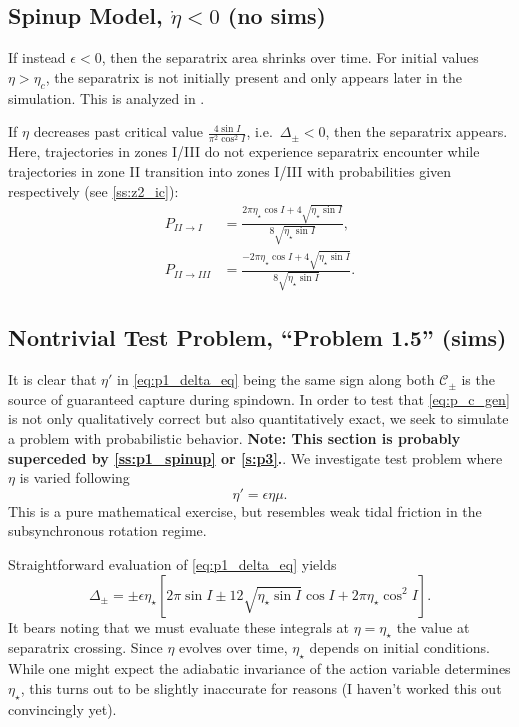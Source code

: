 \documentclass[
        fleqn,
        usenatbib,
    ]{mnras}
\newcommand*{\s}[1]{\left[#1\right]}
\begin{document}
\subsection{Spinup Model, $\dot{\eta} < 0$ (no sims)}\label{ss:p1_spinup}

If instead $\epsilon < 0$, then the separatrix area shrinks over time. For
initial values $\eta > \eta_c$, the separatrix is not initially present and only
appears later in the simulation. This is analyzed in \citep{anderson2018teeter}.

If $\eta$ decreases past critical value $\frac{4\sin I}{\pi^2 \cos^2 I}$, i.e.\
$\Delta_{\pm} < 0$, then the separatrix appears. Here, trajectories in zones
I/III do not experience separatrix encounter while trajectories in zone II
transition into zones I/III with probabilities given respectively (see
\autoref{ss:z2_ic}):
\begin{equation}
    \begin{split}
        P_{II \to I} &= \frac{2\pi \eta_\star \cos I + 4\sqrt{\eta_\star \sin I}}
            {8\sqrt{\eta_\star \sin I}}, \\
        P_{II \to III} &= \frac{-2\pi \eta_\star \cos I + 4\sqrt{\eta_\star \sin
            I}} {8\sqrt{\eta_\star \sin I}}.
    \end{split}
\end{equation}

\subsection{Nontrivial Test Problem, ``Problem 1.5'' (sims)}\label{ss:p1_toy}

It is clear that $\eta'$ in \autoref{eq:p1_delta_eq} being the same sign along
both $\mathcal{C}_{\pm}$ is the source of guaranteed capture during
spindown. In order to test that \autoref{eq:p_c_gen} is not only qualitatively
correct but also quantitatively exact, we seek to simulate a problem with
probabilistic behavior. \textbf{Note: This section is probably superceded by
\autoref{ss:p1_spinup} or \autoref{s:p3}.}. We investigate test problem where
$\eta$ is varied following
\begin{equation}
    \eta' = \epsilon \eta \mu.
\end{equation}
This is a pure mathematical exercise, but resembles weak tidal friction in the
subsynchronous rotation regime.

Straightforward evaluation of \autoref{eq:p1_delta_eq} yields
\begin{equation}
    \Delta_{\pm} = \pm \epsilon \eta_\star \s{
        2\pi \sin I \pm 12 \sqrt{\eta_\star \sin I}\cos I
            + 2\pi \eta_\star \cos^2 I}.
\end{equation}
It bears noting that we must evaluate these integrals at $\eta = \eta_\star$ the
value at separatrix crossing. Since $\eta$ evolves over time, $\eta_{\star}$
depends on initial conditions. While one might expect the adiabatic invariance
of the action variable determines $\eta_\star$, this turns out to be slightly
inaccurate for reasons (I haven't worked this out convincingly yet).
\end{document}
